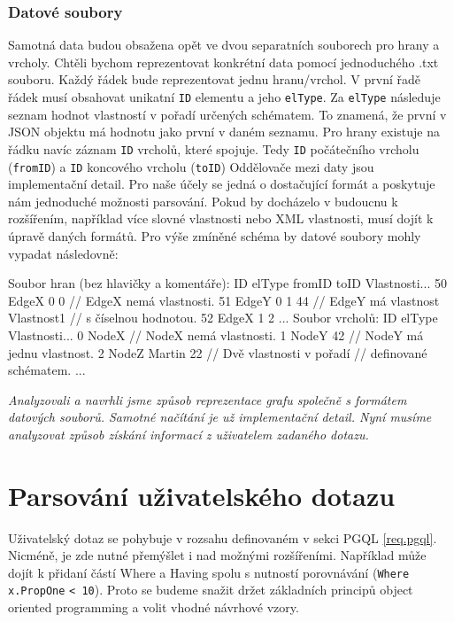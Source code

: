 \subsubsection{Datové soubory}

Samotná data budou obsažena opět ve dvou separatních souborech pro hrany a vrcholy.
Chtěli bychom reprezentovat konkrétní data pomocí jednoduchého .txt souboru.
Každý řádek bude reprezentovat jednu hranu/vrchol.
V první řadě řádek musí obsahovat unikatní \verb+ID+ elementu a jeho \verb+elType+. 
Za \verb+elType+ následuje seznam hodnot vlastností v pořadí určených schématem.
To znamená, že první v JSON objektu má hodnotu jako první v daném seznamu.
Pro hrany existuje na řádku navíc záznam \verb+ID+ vrcholů, které spojuje.
Tedy \texttt{ID} počátečního vrcholu (\texttt{fromID}) a \texttt{ID} koncového vrcholu (\texttt{toID}) 
Oddělovače mezi daty jsou implementační detail.
Pro naše účely se jedná o dostačující formát a poskytuje nám jednoduché možnosti parsování.
Pokud by docházelo v budoucnu k rozšířením, například více slovné vlastnosti nebo XML vlastnosti, musí dojít k úpravě daných formátů.
Pro výše zmíněné schéma by datové soubory mohly vypadat následovně:
\begin{code}
Soubor hran (bez hlavičky a komentáře):
ID elType fromID toID Vlastnosti... 
50 EdgeX 0 0    // EdgeX nemá vlastnosti.
51 EdgeY 0 1 44 // EdgeY má vlastnost Vlastnost1
                // s číselnou hodnotou.
52 EdgeX 1 2   
...
Soubor vrcholů:
ID elType Vlastnosti...
0 NodeX    // NodeX nemá vlastnosti.
1 NodeY 42 // NodeY má jednu vlastnost.
2 NodeZ Martin 22 // Dvě vlastnosti v pořadí
                  // definované schématem.
...
\end{code}

\bigskip
\textit{Analyzovali a navrhli jsme způsob reprezentace grafu společně s formátem datových souborů.
Samotné načítání je už implementační detail.
Nyní musíme analyzovat způsob získání informací z uživatelem zadaného dotazu. }

\section{Parsování uživatelského dotazu}

Uživatelský dotaz se pohybuje v rozsahu definovaném v sekci PGQL \ref{req.pgql}.
Nicméně, je zde nutné přemýšlet i nad možnými rozšířeními.
Například může dojít k přidaní částí Where a Having spolu s nutností porovnávání (\texttt{Where x.PropOne} \texttt{< 10}).
Proto se budeme snažit držet základních principů object oriented programming a volit vhodné návrhové vzory.

